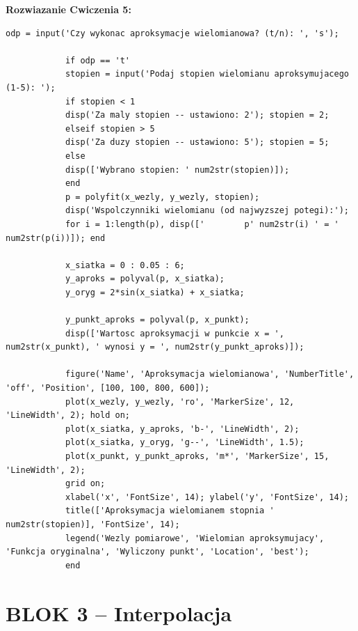 \documentclass[12pt,a4paper]{article}
\begin{document}
	\newpage
	\begin{rozwiazaniebox}
		\textbf{Rozwiazanie Cwiczenia 5:}
		\begin{lstlisting}[caption={Cwiczenie 5 - Aproksymacja wielomianowa}]
			odp = input('Czy wykonac aproksymacje wielomianowa? (t/n): ', 's');
			
			if odp == 't'
			stopien = input('Podaj stopien wielomianu aproksymujacego (1-5): ');
			if stopien < 1
			disp('Za maly stopien -- ustawiono: 2'); stopien = 2;
			elseif stopien > 5
			disp('Za duzy stopien -- ustawiono: 5'); stopien = 5;
			else
			disp(['Wybrano stopien: ' num2str(stopien)]);
			end
			p = polyfit(x_wezly, y_wezly, stopien);
			disp('Wspolczynniki wielomianu (od najwyzszej potegi):');
			for i = 1:length(p), disp(['        p' num2str(i) ' = ' num2str(p(i))]); end
			
			x_siatka = 0 : 0.05 : 6;
			y_aproks = polyval(p, x_siatka);
			y_oryg = 2*sin(x_siatka) + x_siatka;
			
			y_punkt_aproks = polyval(p, x_punkt);
			disp(['Wartosc aproksymacji w punkcie x = ', num2str(x_punkt), ' wynosi y = ', num2str(y_punkt_aproks)]);
			
			figure('Name', 'Aproksymacja wielomianowa', 'NumberTitle', 'off', 'Position', [100, 100, 800, 600]);
			plot(x_wezly, y_wezly, 'ro', 'MarkerSize', 12, 'LineWidth', 2); hold on;
			plot(x_siatka, y_aproks, 'b-', 'LineWidth', 2);
			plot(x_siatka, y_oryg, 'g--', 'LineWidth', 1.5);
			plot(x_punkt, y_punkt_aproks, 'm*', 'MarkerSize', 15, 'LineWidth', 2);
			grid on;
			xlabel('x', 'FontSize', 14); ylabel('y', 'FontSize', 14);
			title(['Aproksymacja wielomianem stopnia ' num2str(stopien)], 'FontSize', 14);
			legend('Wezly pomiarowe', 'Wielomian aproksymujacy', 'Funkcja oryginalna', 'Wyliczony punkt', 'Location', 'best');
			end
		\end{lstlisting}
	\end{rozwiazaniebox}
	
	\newpage
	\section*{\textcolor{headerblue}{BLOK 3 -- Interpolacja}}
	
\end{document}
